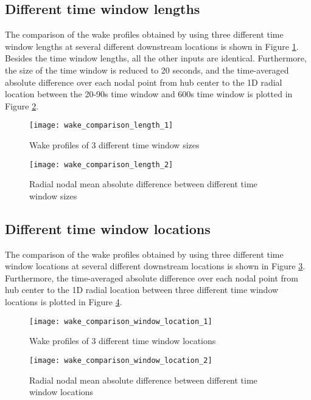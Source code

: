 \documentclass{umthesis}
\begin{document}
\subsection{Different time window lengths}
The comparison of the wake profiles obtained by using three different time window lengths at several different downstream locations is shown in Figure \ref{fig:wake_comparison_length_1}. Besides the time window lengths, all the other inputs are identical. Furthermore, the size of the time window is reduced to 20 seconds, and the time-averaged absolute difference over each nodal point from hub center to the 1D radial location between the 20-90s time window and 600s time window is plotted in Figure \ref{fig:wake_comparison_length_2}.
\begin{figure}
  \centering
  \texttt{[image: wake\_comparison\_length\_1]}
  \caption{Wake profiles of 3 different time window sizes}\label{fig:wake_comparison_length_1}
\end{figure}
\begin{figure}
  \centering
  \texttt{[image: wake\_comparison\_length\_2]}
  \caption{Radial nodal mean absolute difference between different time window sizes}\label{fig:wake_comparison_length_2}
\end{figure}


\subsection{Different time window locations}
The comparison of the wake profiles obtained by using three different time window locations at several different downstream locations is shown in Figure \ref{fig:wake_comparison_window_location_1}. Furthermore, the time-averaged absolute difference over each nodal point from hub center to the 1D radial location between three different time window locations is plotted in Figure \ref{fig:wake_comparison_window_location_2}.
\begin{figure}
  \centering
  \texttt{[image: wake\_comparison\_window\_location\_1]}
  \caption{Wake profiles of 3 different time window locations}\label{fig:wake_comparison_window_location_1}
\end{figure}
\begin{figure}
  \centering
  \texttt{[image: wake\_comparison\_window\_location\_2]}
  \caption{Radial nodal mean absolute difference between different time window locations}\label{fig:wake_comparison_window_location_2}
\end{figure}
\end{document}
